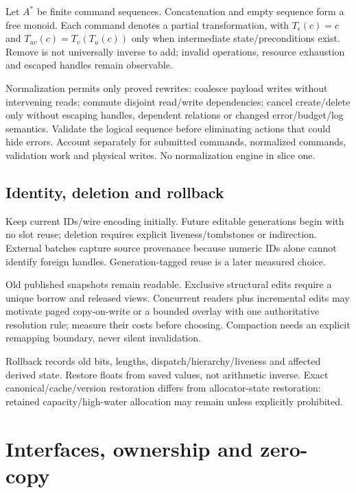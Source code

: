 \documentclass[10pt,a4paper]{article}
\begin{document}
Let $A^*$ be finite command sequences. Concatenation and empty sequence form a free monoid. Each command denotes a partial transformation, with $T_\epsilon(c)=c$ and $T_{uv}(c)=T_v(T_u(c))$ only when intermediate state/preconditions exist. Remove is not universally inverse to add; invalid operations, resource exhaustion and escaped handles remain observable.

Normalization permits only proved rewrites: coalesce payload writes without intervening reads; commute disjoint read/write dependencies; cancel create/delete only without escaping handles, dependent relations or changed error/budget/log semantics. Validate the logical sequence before eliminating actions that could hide errors. Account separately for submitted commands, normalized commands, validation work and physical writes. No normalization engine in slice one.

\subsection{Identity, deletion and rollback}
Keep current IDs/wire encoding initially. Future editable generations begin with no slot reuse; deletion requires explicit liveness/tombstones or indirection. External batches capture source provenance because numeric IDs alone cannot identify foreign handles. Generation-tagged reuse is a later measured choice.

Old published snapshots remain readable. Exclusive structural edits require a unique borrow and released views. Concurrent readers plus incremental edits may motivate paged copy-on-write or a bounded overlay with one authoritative resolution rule; measure their costs before choosing. Compaction needs an explicit remapping boundary, never silent invalidation.

Rollback records old bits, lengths, dispatch/hierarchy/liveness and affected derived state. Restore floats from saved values, not arithmetic inverse. Exact canonical/cache/version restoration differs from allocator-state restoration: retained capacity/high-water allocation may remain unless explicitly prohibited.

\section{Interfaces, ownership and zero-copy}
\label{sec:api}
\end{document}
